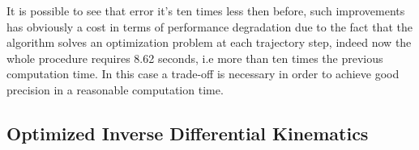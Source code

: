 \begin{figure}[!h]
	\centering
	\hspace{1cm}
\end{figure}

It is possible to see that error it's ten times less then before, such improvements has obviously a cost in terms of performance degradation due to the fact that the algorithm solves an optimization problem at each trajectory step, indeed now the whole procedure requires 8.62 seconds, i.e more than ten times the previous computation time. In this case a trade-off is necessary in order to achieve good precision in a reasonable computation time.

\subsection{Optimized Inverse Differential Kinematics}

